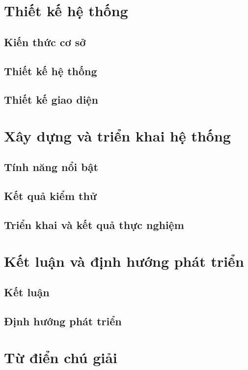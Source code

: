 \documentclass{report}
\begin{document}
\chapter{Thiết kế hệ thống}

\section{Kiến thức cơ sở}


\section{Thiết kế hệ thống}


\section{Thiết kế giao diện}


\chapter{Xây dựng và triển khai hệ thống}

\section{Tính năng nổi bật}


\section{Kết quả kiểm thử}


\section{Triển khai và kết quả thực nghiệm}


\chapter{Kết luận và định hướng phát triển}

\section{Kết luận}


\section{Định hướng phát triển}

\nocite{*}
\printbibliography[heading=bibintoc, title=Tài liệu tham khảo]

\chapter*{Từ điển chú giải}


\end{document}
